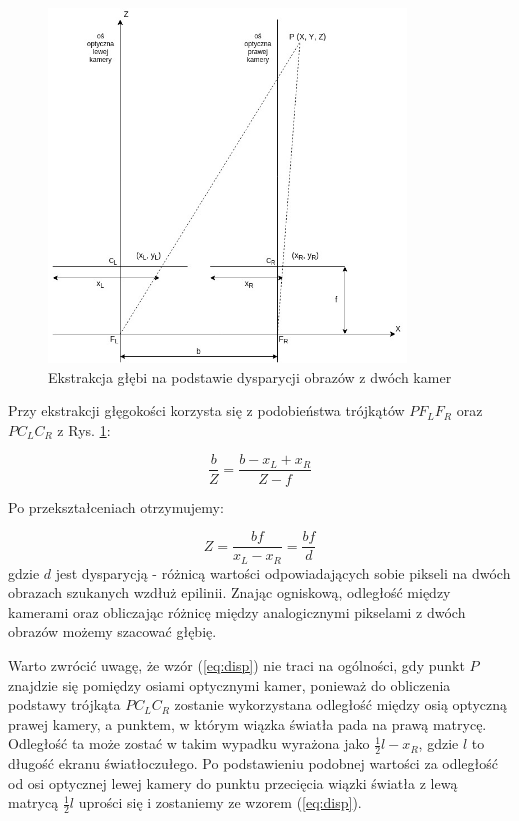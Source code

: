 \documentclass[oneside, eng]{mgr}
\begin{document}
\begin{figure}
	\centering
	\includegraphics[width=9.5cm]{img/ekstrakcja.jpg}
	\caption{Ekstrakcja głębi na podstawie dysparycji obrazów z dwóch kamer}
	\label{fig:extraction}
\end{figure}

Przy ekstrakcji głęgokości korzysta się z podobieństwa trójkątów $P F_L F_R$ oraz $P C_L C_R$ z Rys. \ref{fig:extraction}:

\begin{equation}
	\frac{b}{Z} = \frac{b-x_L+x_R}{Z-f}
	\label{eq:disp}
\end{equation}

Po przekształceniach otrzymujemy:

\begin{equation}
	Z = \frac{bf}{x_L-x_R} = \frac{bf}{d}
\end{equation}
gdzie $d$ jest dysparycją - różnicą wartości odpowiadających sobie pikseli na dwóch obrazach szukanych wzdłuż epilinii.
Znając ogniskową, odległość między kamerami oraz obliczając różnicę między analogicznymi pikselami z dwóch obrazów możemy szacować głębię.

Warto zwrócić uwagę, że wzór (\ref{eq:disp}) nie traci na ogólności, gdy punkt $P$ znajdzie się pomiędzy osiami optycznymi kamer, ponieważ do obliczenia podstawy trójkąta $P C_L C_R$ zostanie wykorzystana odległość między osią optyczną prawej kamery, a punktem, w którym wiązka światła pada na prawą matrycę. Odległość ta może zostać w takim wypadku wyrażona jako $\frac{1}{2}l-x_R$, gdzie $l$ to długość ekranu światłoczułego. Po podstawieniu podobnej wartości za odległość od osi optycznej lewej kamery do punktu przecięcia wiązki światła z lewą matrycą $\frac{1}{2}l$ uprości się i zostaniemy ze wzorem (\ref{eq:disp}).
\end{document}
